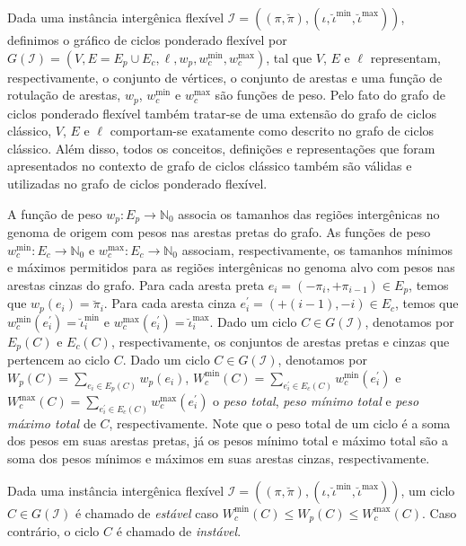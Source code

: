 Dada uma instância intergênica flexível $\mathcal{I} = ((\pi,\breve\pi),(\iota,\breve\iota^{\min},\breve\iota^{\max}))$, definimos o gráfico de ciclos ponderado flexível por $G(\mathcal{I}) = (V, E=E_p \cup E_c, \ell, w_p, w^{\min}_c, w^{\max}_c)$, tal que $V$, $E$ e $\ell$ representam, respectivamente, o conjunto de vértices, o conjunto de arestas e uma função de rotulação de arestas, $w_p$, $w^{\min}_c$ e $w^{\max}_c$ são funções de peso. Pelo fato do grafo de ciclos ponderado flexível também tratar-se de uma extensão do grafo de ciclos clássico, $V$, $E$ e $\ell$ comportam-se exatamente como descrito no grafo de ciclos clássico. Além disso, todos os conceitos, definições e representações que foram apresentados no contexto de grafo de ciclos clássico também são válidas e utilizadas no grafo de ciclos ponderado flexível.

A função de peso $w_p : E_p \rightarrow \mathbb{N}_0$ associa os tamanhos das regiões intergênicas no genoma de origem com pesos nas arestas pretas do grafo. As funções de peso $w^{\min}_c : E_c \rightarrow \mathbb{N}_0$ e $w^{\max}_c : E_c \rightarrow \mathbb{N}_0$ associam, respectivamente, os tamanhos mínimos e máximos permitidos para as regiões intergênicas no genoma alvo com pesos nas arestas cinzas do grafo. Para cada aresta preta $e_i = (-\pi_i, +\pi_{i-1}) \in E_p$, temos que $w_p(e_i) = \breve\pi_i$. Para cada aresta cinza $e^{\prime}_i = (+(i-1), -i) \in E_c$, temos que $w^{\min}_c(e^{\prime}_i) = \breve\iota^{\min}_i$ e $w^{\max}_c(e^{\prime}_i) = \breve\iota^{\max}_i$. Dado um ciclo $C \in G(\mathcal{I})$, denotamos por $E_p(C)$ e $E_c(C)$, respectivamente, os conjuntos de arestas pretas e cinzas que pertencem ao ciclo $C$. Dado um ciclo $C \in G(\mathcal{I})$, denotamos por $W_p(C)=\sum_{e_i \in E_p(C)} w_p(e_i)$, $W^{\min}_c(C)=\sum_{e^{\prime}_i \in E_c(C)} w^{\min}_c(e^{\prime}_i)$ e $W^{\max}_c(C)=\sum_{e^{\prime}_i \in E_c(C)} w^{\max}_c(e^{\prime}_i)$ o \emph{peso total}, \emph{peso mínimo total} e \emph{peso máximo total} de $C$, respectivamente. Note que o peso total de um ciclo é a soma dos pesos em suas arestas pretas, já os pesos mínimo total e máximo total são a soma dos pesos mínimos e máximos em suas arestas cinzas, respectivamente.

\begin{definition}
Dada uma instância intergênica flexível $\mathcal{I} = ((\pi,\breve\pi),(\iota,\breve\iota^{\min},\breve\iota^{\max}))$, um ciclo $C \in G(\mathcal{I})$ é chamado de \emph{estável} caso $W^{\min}_c(C) \le W_p(C) \le W^{\max}_c(C)$. Caso contrário, o ciclo $C$ é chamado de \emph{instável}.
\end{definition}


